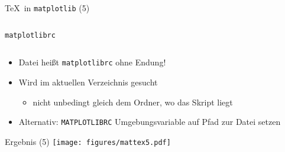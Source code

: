\begin{frame}[fragile]{\TeX\ in \texttt{matplotlib} (5)}
  \inputminted{python}{script/mattex5.py}
\end{frame}

\begin{frame}[fragile]{\texttt{matplotlibrc}}
  \inputminted{text}{script/matplotlibrc}

  \begin{itemize}
    \item Datei heißt \texttt{matplotlibrc} ohne Endung!
    \item Wird im aktuellen Verzeichnis gesucht
      \begin{itemize}
        \item nicht unbedingt gleich dem Ordner, wo das Skript liegt
      \end{itemize}
    \item Alternativ: \texttt{MATPLOTLIBRC} Umgebungsvariable auf Pfad zur Datei setzen
  \end{itemize}
\end{frame}

\AddToShipoutPictureFG*{\ShowFramePicture}
\begin{frame}{Ergebnis (5)}
  \centering
  \texttt{[image: figures/mattex5.pdf]}
\end{frame}
